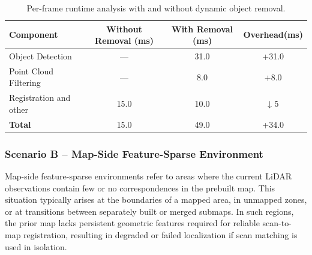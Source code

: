 \begin{table}[H]
	\centering
	\renewcommand{\arraystretch}{0.3}
	\setlength{\tabcolsep}{3pt}
	\caption{Per-frame runtime analysis with and without dynamic object removal.}
	\label{tab:dynamic_object_runtime_pipeline_comparison}
	\begin{tabular}{lccc}
		\toprule
		\textbf{Component} & \textbf{Without Removal (ms)} & \textbf{With Removal (ms)} & \textbf{Overhead(ms)} \\
		\midrule
		Object Detection         & —     & 31.0  & +31.0 \\
		Point Cloud Filtering    & —     & 8.0   & +8.0 \\
		Registration and other            & 15.0  & 10.0   & ↓ 5 \\
		\midrule
		\textbf{Total}           & 15.0  & 49.0  & +34.0 \\
		\bottomrule
	\end{tabular}
\end{table}



\subsubsection{Scenario B – Map-Side Feature-Sparse Environment}

Map-side feature-sparse environments refer to areas where the current LiDAR observations contain few or no correspondences in the prebuilt map. This situation typically arises at the boundaries of a mapped area, in unmapped zones, or at transitions between separately built or merged submaps. In such regions, the prior map lacks persistent geometric features required for reliable scan-to-map registration, resulting in degraded or failed localization if scan matching is used in isolation.

